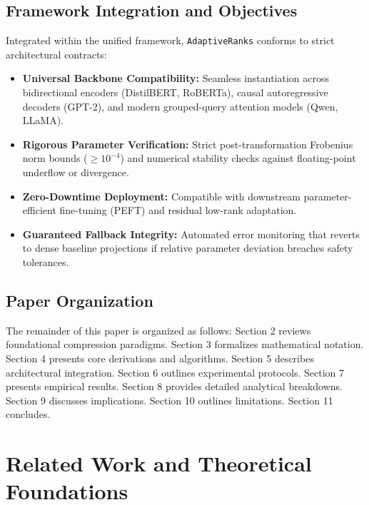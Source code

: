 \subsection{Framework Integration and Objectives}
Integrated within the unified framework, \texttt{AdaptiveRanks} conforms to strict architectural contracts:
\begin{itemize}
\item \textbf{Universal Backbone Compatibility:} Seamless instantiation across bidirectional encoders (DistilBERT, RoBERTa), causal autoregressive decoders (GPT-2), and modern grouped-query attention models (Qwen, LLaMA).
\item \textbf{Rigorous Parameter Verification:} Strict post-transformation Frobenius norm bounds ($\ge 10^{-4}$) and numerical stability checks against floating-point underflow or divergence.
\item \textbf{Zero-Downtime Deployment:} Compatible with downstream parameter-efficient fine-tuning (PEFT) and residual low-rank adaptation.
\item \textbf{Guaranteed Fallback Integrity:} Automated error monitoring that reverts to dense baseline projections if relative parameter deviation breaches safety tolerances.
\end{itemize}

\subsection{Paper Organization}
The remainder of this paper is organized as follows: Section 2 reviews foundational compression paradigms. Section 3 formalizes mathematical notation. Section 4 presents core derivations and algorithms. Section 5 describes architectural integration. Section 6 outlines experimental protocols. Section 7 presents empirical results. Section 8 provides detailed analytical breakdowns. Section 9 discusses implications. Section 10 outlines limitations. Section 11 concludes.


\section{Related Work and Theoretical Foundations}

